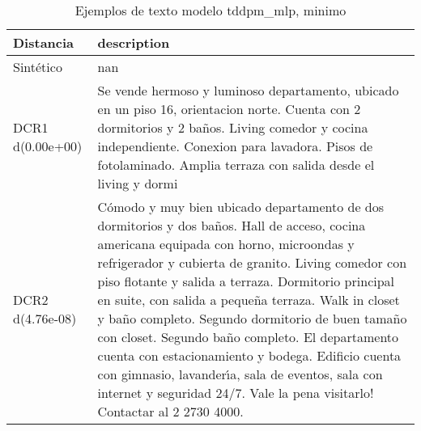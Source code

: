 \begin{table}[H]
\centering
\fontsize{10}{14}\selectfont
\caption{Ejemplos de texto modelo tddpm\_mlp, minimo}
\label{table-example-economicos-a-3-tddpm_mlp-min-text}
\begin{tabular}{|l|m{35em}|}
\hline
\rowcolor[gray]{0.8}
Distancia & description \\
\hline Sintético & nan \\
\hline DCR1 d(0.00e+00) & Se vende hermoso y luminoso departamento, ubicado en un piso 16, orientacion norte. Cuenta con 2 dormitorios y 2 ba\~nos. Living comedor y cocina independiente. Conexion para lavadora. Pisos de fotolaminado. Amplia terraza con salida desde el living y dormi \\
\hline DCR2 d(4.76e-08) & C\'omodo y muy bien ubicado departamento de dos dormitorios y dos ba\~nos. Hall de acceso, cocina americana equipada con horno, microondas y refrigerador y cubierta de granito. Living comedor con piso flotante y salida a terraza. Dormitorio principal en suite, con salida a peque\~na terraza. Walk in closet y ba\~no completo. Segundo dormitorio de buen tama\~no con closet. Segundo ba\~no completo. El departamento cuenta con estacionamiento y bodega.  Edificio cuenta con gimnasio, lavander{\'\i}a, sala de eventos, sala con internet y seguridad 24/7.  Vale la pena visitarlo! Contactar al 2 2730 4000. \\
\hline
\end{tabular}
\end{table}
